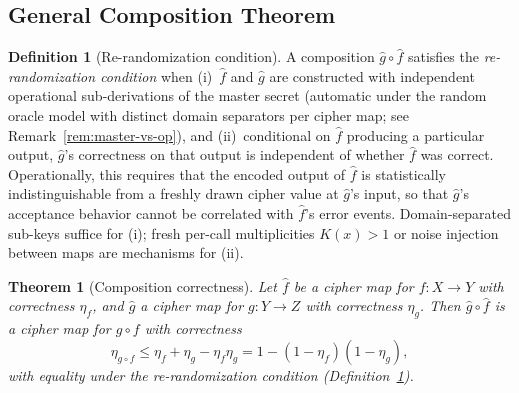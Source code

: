 \documentclass[11pt]{article}
\theoremstyle{definition}
\newtheorem{definition}{Definition}[section]
\theoremstyle{plain}
\newtheorem{theorem}{Theorem}[section]
\theoremstyle{remark}
\newcommand{\fhat}{\hat{f}}
\newcommand{\ghat}{\hat{g}}
\begin{document}
\subsection{General Composition Theorem}

\begin{definition}[Re-randomization condition]
\label{def:re-randomization}
A composition $\ghat \circ \fhat$ satisfies the \emph{re-randomization
condition} when (i)~$\fhat$ and $\ghat$ are constructed with
independent operational sub-derivations of the master secret (automatic
under the random oracle model with distinct domain separators per
cipher map; see Remark~\ref{rem:master-vs-op}), and
(ii)~conditional on $\fhat$ producing a particular output, $\ghat$'s
correctness on that output is independent of whether $\fhat$ was
correct.  Operationally, this requires that the encoded output of
$\fhat$ is statistically indistinguishable from a freshly drawn cipher
value at $\ghat$'s input, so that $\ghat$'s acceptance behavior cannot
be correlated with $\fhat$'s error events.  Domain-separated sub-keys
suffice for (i); fresh per-call multiplicities $K(x) > 1$ or noise
injection between maps are mechanisms for (ii).
\end{definition}

\begin{theorem}[Composition correctness]
\label{thm:composition}
Let $\fhat$ be a cipher map for $f : X \to Y$ with correctness $\eta_f$,
and $\ghat$ a cipher map for $g : Y \to Z$ with correctness $\eta_g$.  Then
$\ghat \circ \fhat$ is a cipher map for $g \circ f$ with correctness
\begin{equation}
\eta_{g \circ f} \leq \eta_f + \eta_g - \eta_f \eta_g
  = 1 - (1 - \eta_f)(1 - \eta_g),
\end{equation}
with equality under the re-randomization condition
(Definition~\ref{def:re-randomization}).
\end{theorem}
\end{document}
